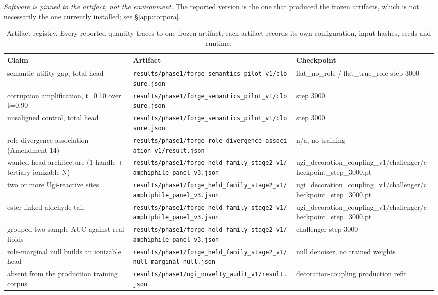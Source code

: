 \documentclass{article}
\begin{document}
\emph{Software is pinned to the artifact, not the environment.} The reported version is the one that
produced the frozen artifacts, which is not necessarily the one currently installed; see
\S\ref{app:corpora}.
\begin{table}[h]
\centering
\scriptsize
\caption{Artifact registry. Every reported quantity traces to one frozen artifact; each artifact records its own configuration, input hashes, seeds and runtime.}
\label{tab:registry}
\begin{tabular}{@{}p{4.0cm}p{6.1cm}p{2.4cm}@{}}
\toprule
Claim & Artifact & Checkpoint \\
\midrule
semantic-utility gap, total head & \texttt{results/phase1/forge\_semantics\_pilot\_v1/closure.json} & flat\_no\_role / flat\_true\_role step 3000 \\
corruption amplification, t=0.10 over t=0.90 & \texttt{results/phase1/forge\_semantics\_pilot\_v1/closure.json} & step 3000 \\
misaligned control, total head & \texttt{results/phase1/forge\_semantics\_pilot\_v1/closure.json} & step 3000 \\
role-divergence association (Amendment 14) & \texttt{results/phase1/forge\_role\_divergence\_association\_v1/result.json} & n/a, no training \\
wanted head architecture (1 handle + tertiary ionizable N) & \texttt{results/phase1/forge\_held\_family\_stage2\_v1/amphiphile\_panel\_v3.json} & ugi\_decoration\_coupling\_v1/challenger/checkpoint\_step\_3000.pt \\
two or more Ugi-reactive sites & \texttt{results/phase1/forge\_held\_family\_stage2\_v1/amphiphile\_panel\_v3.json} & ugi\_decoration\_coupling\_v1/challenger/checkpoint\_step\_3000.pt \\
ester-linked aldehyde tail & \texttt{results/phase1/forge\_held\_family\_stage2\_v1/amphiphile\_panel\_v3.json} & ugi\_decoration\_coupling\_v1/challenger/checkpoint\_step\_3000.pt \\
grouped two-sample AUC against real lipids & \texttt{results/phase1/forge\_held\_family\_stage2\_v1/amphiphile\_panel\_v3.json} & challenger step 3000 \\
role-marginal null builds an ionizable head & \texttt{results/phase1/forge\_held\_family\_stage2\_v1/null\_marginal\_null.json} & null denoiser, no trained weights \\
absent from the production training corpus & \texttt{results/phase1/ugi\_novelty\_audit\_v1/result.json} & decoration-coupling production refit \\

\end{tabular}
\end{table}
\end{document}

